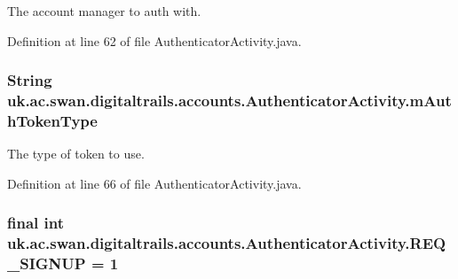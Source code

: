 The account manager to auth with. 



Definition at line 62 of file Authenticator\+Activity.\+java.

\hypertarget{classuk_1_1ac_1_1swan_1_1digitaltrails_1_1accounts_1_1_authenticator_activity_a7717e101ad13a0c9ee7d6dd0cc8c325a}{
\subsubsection[{m\+Auth\+Token\+Type}]{\setlength{\rightskip}{0pt plus 5cm}String uk.\+ac.\+swan.\+digitaltrails.\+accounts.\+Authenticator\+Activity.\+m\+Auth\+Token\+Type\hspace{0.3cm}{\ttfamily [private]}}}\label{classuk_1_1ac_1_1swan_1_1digitaltrails_1_1accounts_1_1_authenticator_activity_a7717e101ad13a0c9ee7d6dd0cc8c325a}


The type of token to use. 



Definition at line 66 of file Authenticator\+Activity.\+java.

\hypertarget{classuk_1_1ac_1_1swan_1_1digitaltrails_1_1accounts_1_1_authenticator_activity_a579141e20f12908d216f31855b4b2d8e}{
\subsubsection[{R\+E\+Q\+\_\+\+S\+I\+G\+N\+U\+P}]{\setlength{\rightskip}{0pt plus 5cm}final int uk.\+ac.\+swan.\+digitaltrails.\+accounts.\+Authenticator\+Activity.\+R\+E\+Q\+\_\+\+S\+I\+G\+N\+U\+P = 1\hspace{0.3cm}{\ttfamily [private]}}}\label{classuk_1_1ac_1_1swan_1_1digitaltrails_1_1accounts_1_1_authenticator_activity_a579141e20f12908d216f31855b4b2d8e}


